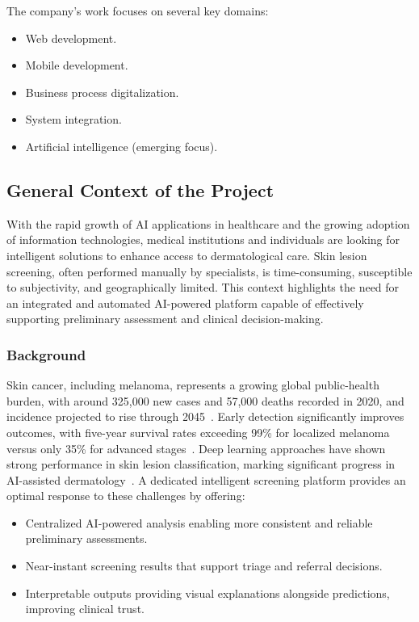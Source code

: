 	The company's work focuses on several key domains:
	
	\begin{itemize}
	  \item Web development.
	  \item Mobile development.
	  \item Business process digitalization.
	  \item System integration.
	  \item Artificial intelligence (emerging focus).
	\end{itemize}
	
	
	\subsection{General Context of the Project}
	
	With the rapid growth of AI applications in healthcare and the growing adoption of
	information technologies, medical institutions and individuals are looking for intelligent
	solutions to enhance access to dermatological care. Skin lesion screening, often performed
	manually by specialists, is time-consuming, susceptible to subjectivity, and geographically
	limited. This context highlights the need for an integrated and automated AI-powered
	platform capable of effectively supporting preliminary assessment and clinical
	decision-making.
	
	\subsubsection{Background}
	
	Skin cancer, including melanoma, represents a growing global public-health burden,
	with around 325,000 new cases and 57,000 deaths recorded in 2020, and incidence
	projected to rise through 2045~\cite{Arnold2022, Liu2024}. Early detection
	significantly improves outcomes, with five-year survival rates exceeding 99\% for
	localized melanoma versus only 35\% for advanced stages~\cite{SkinCancerOrg}.
	Deep learning approaches have shown strong performance in skin lesion classification,
	marking significant progress in AI-assisted dermatology~\cite{Wu2022, Kassem2021,
	Debelee2023}. A dedicated intelligent screening platform provides an optimal
	response to these challenges by offering:
	
	\begin{itemize}
	  \item Centralized AI-powered analysis enabling more consistent and reliable preliminary
	        assessments.
	  \item Near-instant screening results that support triage and referral decisions.
	  \item Interpretable outputs providing visual explanations alongside predictions,
	        improving clinical trust.
	\end{itemize}
	
